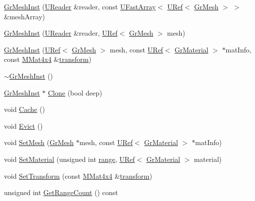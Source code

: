 \begin{CompactItemize}
\item 
\hyperlink{class_gr_mesh_inst_cefd284db81d59a5b3a5ec94c264bbc6}{GrMeshInst} (\hyperlink{class_u_reader}{UReader} \&reader, const \hyperlink{class_u_fast_array}{UFastArray}$<$ \hyperlink{class_u_ref}{URef}$<$ \hyperlink{class_gr_mesh}{GrMesh} $>$ $>$ \&meshArray)
\item 
\hyperlink{class_gr_mesh_inst_151b8cdec16292044f816c74e6d24728}{GrMeshInst} (\hyperlink{class_u_reader}{UReader} \&reader, \hyperlink{class_u_ref}{URef}$<$ \hyperlink{class_gr_mesh}{GrMesh} $>$ mesh)
\item 
\hyperlink{class_gr_mesh_inst_f9d8e471f792ed098eb6659bbc509bdf}{GrMeshInst} (\hyperlink{class_u_ref}{URef}$<$ \hyperlink{class_gr_mesh}{GrMesh} $>$ mesh, const \hyperlink{class_u_ref}{URef}$<$ \hyperlink{class_gr_material}{GrMaterial} $>$ $\ast$matInfo, const \hyperlink{class_m_mat4x4}{MMat4x4} \&\hyperlink{glext__bak_8h_07993c0d92c1aeeb357ba0495c8b5325}{transform})
\item 
\hyperlink{class_gr_mesh_inst_f18054641cab00c250bc12ff3c08bd68}{$\sim$GrMeshInst} ()
\item 
\hyperlink{class_gr_mesh_inst}{GrMeshInst} $\ast$ \hyperlink{class_gr_mesh_inst_bf9b7e7034565212105f98fedc9553cf}{Clone} (bool deep)
\item 
void \hyperlink{class_gr_mesh_inst_4c6828378720aba2c1d44fc5fbc57abc}{Cache} ()
\item 
void \hyperlink{class_gr_mesh_inst_68b3d9c5002c1aee40039aa74a3773e5}{Evict} ()
\item 
void \hyperlink{class_gr_mesh_inst_ebabf6ad0f5987ec8b68248762c9f993}{SetMesh} (\hyperlink{class_gr_mesh}{GrMesh} $\ast$mesh, const \hyperlink{class_u_ref}{URef}$<$ \hyperlink{class_gr_material}{GrMaterial} $>$ $\ast$matInfo)
\item 
void \hyperlink{class_gr_mesh_inst_2707fa3259b8562e464c9f538a3b54ff}{SetMaterial} (unsigned int \hyperlink{glext__bak_8h_7b8ad0b27a927682837f95528fa454f5}{range}, \hyperlink{class_u_ref}{URef}$<$ \hyperlink{class_gr_material}{GrMaterial} $>$ material)
\item 
void \hyperlink{class_gr_mesh_inst_537661a0767b6c95785f95088325d80d}{SetTransform} (const \hyperlink{class_m_mat4x4}{MMat4x4} \&\hyperlink{glext__bak_8h_07993c0d92c1aeeb357ba0495c8b5325}{transform})
\item 
unsigned int \hyperlink{class_gr_mesh_inst_cbd495c05b5c83745059b6d842470607}{GetRangeCount} () const 
\item 

\end{CompactItemize}
